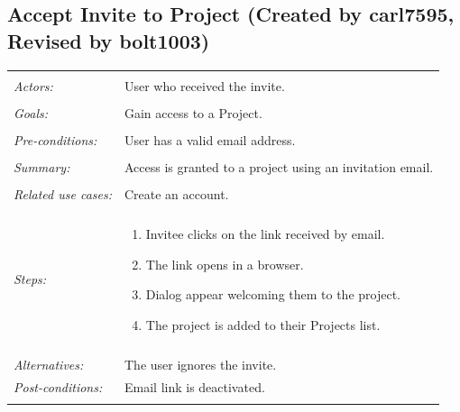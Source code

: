 \documentclass[11pt]{report}
\begin{document}
\subsection{Accept Invite to Project (Created by carl7595, Revised by bolt1003)}
\begin{tabular}{ p{2cm} p{12cm} }   
 \hline
 \\
 \textit{Actors:} & User who received the invite. \\
 \\
 \textit{Goals:} & Gain access to a Project. \\
 \\
 \textit{Pre-conditions:} & User has a valid email address. \\
 \\
 \textit{Summary:} & Access is granted to a project using an invitation email. \\ 
 \\
 \textit{Related use cases:} & Create an account. \\
 \\
 \textit{Steps:} & \begin{enumerate}
  \item Invitee clicks on the link received by email.
	 \item The link opens in a browser.
	 \item Dialog appear welcoming them to the project.
	 \item The project is added to their Projects list.
	\end{enumerate} \\
 \\
 \textit{Alternatives:} & The user ignores the invite. \\
 \textit{Post-conditions:} & Email link is deactivated. \\
 \\
\hline
\end{tabular}
\end{document}
